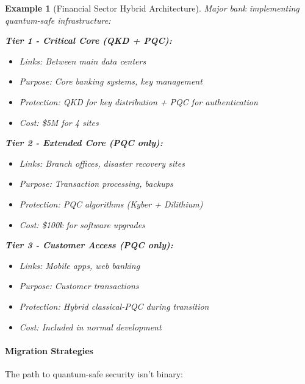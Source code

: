 \documentclass[11pt,a4paper]{article}
\newtheorem{example}{Example}
\begin{document}
\begin{example}[Financial Sector Hybrid Architecture]
Major bank implementing quantum-safe infrastructure:

\textbf{Tier 1 - Critical Core (QKD + PQC):}
\begin{itemize}
    \item Links: Between main data centers
    \item Purpose: Core banking systems, key management
    \item Protection: QKD for key distribution + PQC for authentication
    \item Cost: \$5M for 4 sites
\end{itemize}

\textbf{Tier 2 - Extended Core (PQC only):}
\begin{itemize}
    \item Links: Branch offices, disaster recovery sites
    \item Purpose: Transaction processing, backups
    \item Protection: PQC algorithms (Kyber + Dilithium)
    \item Cost: \$100k for software upgrades
\end{itemize}

\textbf{Tier 3 - Customer Access (PQC only):}
\begin{itemize}
    \item Links: Mobile apps, web banking
    \item Purpose: Customer transactions
    \item Protection: Hybrid classical-PQC during transition
    \item Cost: Included in normal development
\end{itemize}
\end{example}

\paragraph{Migration Strategies}

The path to quantum-safe security isn't binary:
\end{document}
